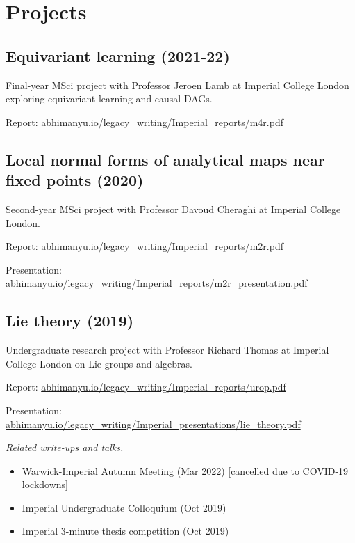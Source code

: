 \documentclass{article}
\newenvironment{relatedwork}
   {
     \begin{mdframed}[
       leftmargin=1cm,
       rightmargin=0cm,
       innerleftmargin=10pt,
       innerrightmargin=0pt,
       innertopmargin=0.5em,
       innerbottommargin=0.5em,
       linewidth=1pt,
       linecolor=gray,
       topline=false,
       bottomline=false,
       rightline=false
     ]
     \footnotesize
   }
   {
     \end{mdframed}
   }
\begin{document}
\section*{Projects}

\subsection*{Equivariant learning (2021-22)}

Final-year MSci project with Professor Jeroen Lamb at Imperial College London exploring equivariant learning and causal DAGs.

Report: \href{https://abhimanyu.io/legacy_writing/Imperial_reports/m4r.pdf}{abhimanyu.io/legacy\_writing/Imperial\_reports/m4r.pdf}

\subsection*{Local normal forms of analytical maps near fixed points (2020)}

Second-year MSci project with Professor Davoud Cheraghi at Imperial College London.

Report: \href{https://abhimanyu.io/legacy_writing/Imperial_reports/m2r.pdf}{abhimanyu.io/legacy\_writing/Imperial\_reports/m2r.pdf}

Presentation: \href{https://abhimanyu.io/legacy_writing/Imperial_reports/m2r_presentation.pdf}{abhimanyu.io/legacy\_writing/Imperial\_reports/m2r\_presentation.pdf}

\subsection*{Lie theory (2019)}

Undergraduate research project with Professor Richard Thomas at Imperial College London on Lie groups and algebras.

Report: \href{https://abhimanyu.io/legacy_writing/Imperial_reports/urop.pdf}{abhimanyu.io/legacy\_writing/Imperial\_reports/urop.pdf}

Presentation: \href{https://abhimanyu.io/legacy_writing/Imperial_presentations/lie_theory.pdf}{abhimanyu.io/legacy\_writing/Imperial\_presentations/lie\_theory.pdf}

\begin{relatedwork}
    \emph{Related write-ups and talks.}
    \begin{itemize}[label=—]
        \item Warwick-Imperial Autumn Meeting (Mar 2022) [cancelled due to COVID-19 lockdowns]
        \item Imperial Undergraduate Colloquium (Oct 2019)
        \item Imperial 3-minute thesis competition (Oct 2019)
    \end{itemize}
\end{relatedwork}
\end{document}
